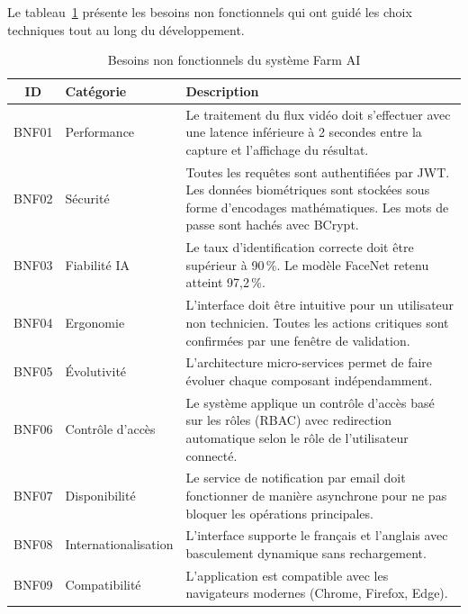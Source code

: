 \documentclass[12pt,a4paper]{report}
\numberwithin{figure}{chapter}
\numberwithin{table}{chapter}
\begin{document}
Le tableau~\ref{tab:besoins_non_fonctionnels} présente les besoins non fonctionnels qui ont
guidé les choix techniques tout au long du développement.

\begin{table}[H]
  \centering
  \caption{Besoins non fonctionnels du système Farm AI}
  \label{tab:besoins_non_fonctionnels}
  \renewcommand{\arraystretch}{1.4}
  \begin{tabularx}{\textwidth}{|c|l|X|}
    \hline
    \rowcolor{gray!20}
    \textbf{ID} & \textbf{Catégorie} & \textbf{Description} \\
    \hline
    BNF01 & Performance &
      Le traitement du flux vidéo doit s'effectuer avec une latence inférieure à 2 secondes entre la capture et l'affichage du résultat. \\
    \hline
    BNF02 & Sécurité &
      Toutes les requêtes sont authentifiées par JWT. Les données biométriques sont stockées sous forme d'encodages mathématiques. Les mots de passe sont hachés avec BCrypt. \\
    \hline
    BNF03 & Fiabilité IA &
      Le taux d'identification correcte doit être supérieur à 90\,\%. Le modèle FaceNet retenu atteint 97,2\,\%. \\
    \hline
    BNF04 & Ergonomie &
      L'interface doit être intuitive pour un utilisateur non technicien. Toutes les actions critiques sont confirmées par une fenêtre de validation. \\
    \hline
    BNF05 & Évolutivité &
      L'architecture micro-services permet de faire évoluer chaque composant indépendamment. \\
    \hline
    BNF06 & Contrôle d'accès &
      Le système applique un contrôle d'accès basé sur les rôles (RBAC) avec redirection automatique selon le rôle de l'utilisateur connecté. \\
    \hline
    BNF07 & Disponibilité &
      Le service de notification par email doit fonctionner de manière asynchrone pour ne pas bloquer les opérations principales. \\
    \hline
    BNF08 & Internationalisation &
      L'interface supporte le français et l'anglais avec basculement dynamique sans rechargement. \\
    \hline
    BNF09 & Compatibilité &
      L'application est compatible avec les navigateurs modernes (Chrome, Firefox, Edge). \\
    \hline
  \end{tabularx}
\end{table}
\end{document}
